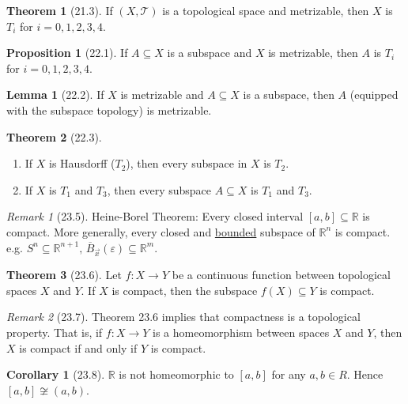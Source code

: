 \documentclass{article}
\newcommand{\R}{\ensuremath{\mathbb{R}}}
\newcommand{\Iff}{if and only if}
\newcommand{\ts}{topological space}
\newcommand{\func}[3]{\ensuremath{#1: #2 \to #3}}
\newcommand{\Ball}[3]{\ensuremath{\overline{B}_{#1}^{#2}(#3)}}
\newcommand{\homeo}{\cong}
\newcommand{\tp}{\ensuremath{\mathscr{T}}}
\newcommand{\Ts}[2]{\ensuremath{(#1,#2)}}
\renewcommand{\Subset}{\subseteq}
\theoremstyle{definition}
\newtheorem*{cor}{Corollary}
\newtheorem*{thm}{Theorem}
\newtheorem*{prop}{Proposition}
\newtheorem*{lem}{Lemma}
\theoremstyle{remark}
\newtheorem*{rmk}{Remark}
\begin{document}
{        \begin{thm}[21.3]
            If $\Ts{X}{\tp}$ is a \ts{} and metrizable, then $X$ is $T_i$ for $i=0,1,2,3,4$.
        \end{thm}
        
        \begin{prop}[22.1]
            If $A \Subset X$ is a subspace and $X$ is metrizable, then $A$ is $T_i$ for $i=0,1,2,3,4$.
        \end{prop}
        
        \begin{lem}[22.2]
            If $X$ is metrizable and $A \Subset X$ is a subspace, then $A$ (equipped with the subspace topology) is metrizable.
        \end{lem}
        
        \begin{thm}[22.3]\hfill
            \begin{enumerate}
                \item If $X$ is Hausdorff ($T_2$), then every subspace in $X$ is $T_2$.
                \item If $X$ is $T_1$ and $T_3$, then every subspace $A \Subset X$ is $T_1$ and $T_3$.
            \end{enumerate}
        \end{thm}
        
        \begin{rmk}[23.5]
            Heine-Borel Theorem: Every closed interval $[a,b] \Subset \R$ is compact. More generally, every closed and \underline{bounded} subspace of $\R^n$ is compact. e.g. $S^n \Subset \R^{n+1}, \, \Ball{\Vec{x}}{}{\varepsilon} \Subset \R^m$.
        \end{rmk}
        
        \begin{thm}[23.6]
            Let $\func{f}{X}{Y}$ be a continuous function between topological spaces $X$ and $Y$. If $X$ is compact, then the subspace $f(X) \Subset Y$ is compact.
        \end{thm}
        
        \begin{rmk}[23.7]
            Theorem 23.6 implies that compactness is a topological property. That is, if $\func{f}{X}{Y}$ is a homeomorphism between spaces $X$ and $Y$, then $X$ is compact \Iff{} $Y$ is compact.
        \end{rmk}
        
        \begin{cor}[23.8]
            $\R$ is not homeomorphic to $[a,b]$ for any $a,b\in R$. Hence $[a,b] \not\homeo (a,b)$.
        \end{cor}
        
    }
\end{document}
